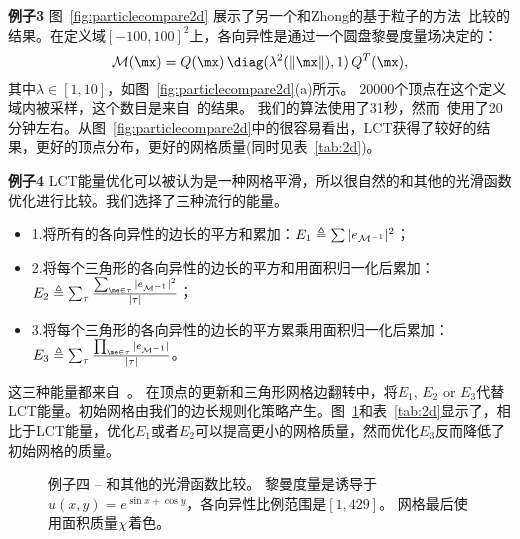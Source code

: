 \textbf{例子3}\quad
图~\ref{fig:particlecompare2d} 展示了另一个和Zhong的基于粒子的方法~\cite{Zhong2013}比较的结果。在定义域$[-100,100]^2$上，各向异性是通过一个圆盘黎曼度量场决定的：
$$\mathcal{M}(\mx) = Q(\mx) \, \diag(\lambda^2(\|\mx\|), 1) \, Q^T(\mx),$$
其中$\lambda \in [1,10]$，如图~\ref{fig:particlecompare2d}(a)所示。
20000个顶点在这个定义域内被采样，这个数目是来自~\cite{Zhong2013}的结果。 我们的算法使用了31秒，然而~\cite{Zhong2013}使用了20分钟左右。从图~\ref{fig:particlecompare2d}中的很容易看出，LCT获得了较好的结果，更好的顶点分布，更好的网格质量(同时见表~\ref{tab:2d})。

\textbf{例子4}\quad
LCT能量优化可以被认为是一种网格平滑，所以很自然的和其他的光滑函数优化进行比较。我们选择了三种流行的能量。
\begin{itemize}
\item 1.将所有的各向异性的边长的平方和累加：$E_1 \triangleq \sum |e_{\mathcal{M}^{-1}}|^2$；
\item 2.将每个三角形的各向异性的边长的平方和用面积归一化后累加： $E_2 \triangleq \sum_\tau \frac{\sum_{\me \in \tau} |e_\Minv|^2}{|\tau|}$；
\item 3.将每个三角形的各向异性的边长的平方累乘用面积归一化后累加：$E_3 \triangleq \sum_\tau \frac{\prod_{\me \in \tau} |e_\Minv|}{|\tau|}$。
\end{itemize}
这三种能量都来自~\cite{Shewchuk2002}。
在顶点的更新和三角形网格边翻转中，将$E_1$, $E_2$ or $E_3$代替LCT能量。初始网格由我们的边长规则化策略产生。图~\ref{fig:energy}和表~\ref{tab:2d}显示了，相比于LCT能量，优化$E_1$或者$E_2$可以提高更小的网格质量，然而优化$E_3$反而降低了初始网格的质量。

\begin{figure}[t]
\centerline
{
\hfill
{}
\hfill
{}
}
\centerline{
\qquad
{}
}
\vspace{-2mm}
\caption{例子四 -- 和其他的光滑函数比较。 黎曼度量是诱导于$u(x,y)=e^{\sin x + \cos y}$，各向异性比例范围是$[1,429]$。 网格最后使用面积质量$\chi$着色。
}
\label{fig:energy}
\vspace{-3mm}
\end{figure}

